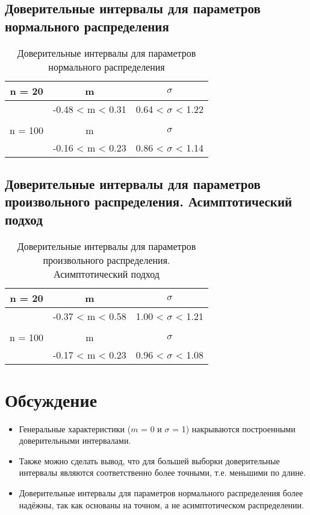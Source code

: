 \documentclass[12pt,a4paper]{scrartcl}
\begin{document}
	\subsection{Доверительные интервалы для параметров нормального распределения}
	\begin{table}[H]
	    \centering
	    \begin{tabular}{| c | c | c |}
\hline
 n = 20  & m                & $\sigma$               \\  \hline
         & -0.48 < m < 0.31 & 0.64 < $\sigma$ < 1.22 \\  \hline
         &                  &                        \\  \hline
 n = 100 & m                & $\sigma$               \\  \hline
         & -0.16 < m < 0.23 & 0.86 < $\sigma$ < 1.14 \\
\hline
	    \end{tabular}
	    \caption{Доверительные интервалы для параметров нормального распределения}
	    \label{tab:interv_simple}
	\end{table}
	
	\subsection{Доверительные интервалы для параметров произвольного распределения. Асимптотический подход}
		\begin{table}[H]
	    \centering
	    \begin{tabular}{| c | c | c |}
	    \hline
 n = 20  & m                & $\sigma$               \\  \hline
         & -0.37 < m < 0.58 & 1.00 < $\sigma$ < 1.21 \\  \hline
         &                  &                        \\  \hline
 n = 100 & m                & $\sigma$               \\  \hline
         & -0.17 < m < 0.23 & 0.96 < $\sigma$ < 1.08 \\  \hline
	    \end{tabular}
	    \caption{Доверительные интервалы для параметров произвольного распределения. Асимптотический подход}
	    \label{tab:interv_asimpt}
\end{table}

\section{Обсуждение}
\begin{itemize}
    \item Генеральные характеристики ($m$ = 0 и $\sigma$ = 1) накрываются построенными доверительными интервалами. 
    \item Также можно сделать вывод, что для большей выборки доверительные интервалы являются соответственно более точными, т.е. меньшими по длине.
    \item Доверительные интервалы для параметров нормального распределения более надёжны, так как основаны на точном, а не асимптотическом распределении.
\end{itemize}
\end{document}
